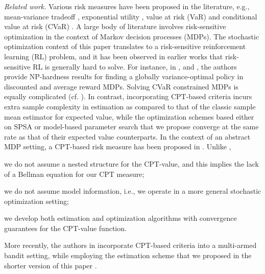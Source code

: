 \textit{Related work.}
Various risk measures have been proposed in the literature, e.g., mean-variance tradeoff \cite{markowitz1952portfolio}, exponential utility \cite{Arrow1971}, value at risk (VaR) and conditional value at risk (CVaR) \cite{rockafellar2000optimization}. A large body of literature involves risk-sensitive optimization in the context of Markov decision processes (MDPs).   
The stochastic optimization context of this paper translates to a risk-sensitive reinforcement learning (RL) problem, and it has been observed in earlier works that risk-sensitive RL is generally hard to solve. 
For instance, in \cite{Sobel82VD}, \cite{filar1989variance} and \cite{mannor2013algorithmic}, the authors provide NP-hardness results for finding a globally variance-optimal policy in discounted and average reward MDPs.
Solving CVaR constrained MDPs is equally complicated (cf. \cite{borkar2010risk,prashanth2014policy}). In contrast, incorporating CPT-based criteria incurs extra sample complexity in estimation as compared to that of the classic sample mean estimator for expected value, while the optimization schemes based either on SPSA or model-based parameter search \cite{chang2013simulation} that we propose converge at the same rate as that of their expected value counterparts. 
In the context of an abstract MDP setting, a CPT-based risk measure has been proposed in \cite{lin2013stochastic}. Unlike \cite{lin2013stochastic},
\begin{inparaenum}[\it (i)]
\item we do not assume a nested structure for the CPT-value, %
and this implies the lack of a Bellman equation for our CPT measure;
\item we do not assume model information, i.e., we operate in a more general stochastic optimization setting;
\item we develop both estimation and optimization algorithms with convergence guarantees for the CPT-value function.
\end{inparaenum}
More recently, the authors in \cite{aditya2016weighted} incorporate CPT-based criteria into a multi-armed bandit setting, while employing the estimation scheme that we proposed in the shorter version of this paper \cite{la2016cumulative}. 

